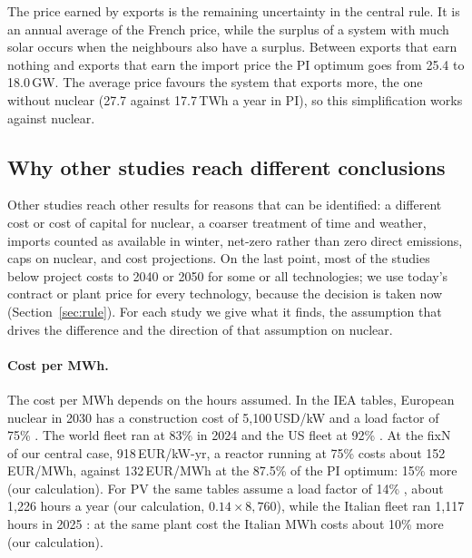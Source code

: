 The price earned by exports is the remaining uncertainty in the central rule. It is an annual average of the French price, while the surplus of a system with much solar occurs when the neighbours also have a surplus. Between exports that earn nothing and exports that earn the import price the PI optimum goes from 25.4 to 18.0\,GW. The average price favours the system that exports more, the one without nuclear (27.7 against 17.7\,TWh a year in PI), so this simplification works against nuclear.


\subsection{Why other studies reach different conclusions}\label{sec:others}
Other studies reach other results for reasons that can be identified: a different cost or cost of capital for nuclear, a coarser treatment of time and weather, imports counted as available in winter, net-zero rather than zero direct emissions, caps on nuclear, and cost projections. On the last point, most of the studies below project costs to 2040 or 2050 for some or all technologies; we use today's contract or plant price for every technology, because the decision is taken now (Section~\ref{sec:rule}). For each study we give what it finds, the assumption that drives the difference and the direction of that assumption on nuclear.

\paragraph{Cost per MWh.} The cost per MWh depends on the hours assumed. In the IEA tables, European nuclear in 2030 has a construction cost of 5{,}100\,USD/kW and a load factor of 75\% \citep[Annex~B, Tables B.4a and B.4b]{IEA2024WEO}. The world fleet ran at 83\% in 2024 \citep{WNAPerformance2025} and the US fleet at 92\% \citep{EIA2025TIE}. At the fixN of our central case, 918\,EUR/kW-yr, a reactor running at 75\% costs about 152\,EUR/MWh, against 132\,EUR/MWh at the 87.5\% of the PI optimum: 15\% more (our calculation). For PV the same tables assume a load factor of 14\% \citep[Table B.4a]{IEA2024WEO}, about 1{,}226 hours a year (our calculation, $0.14 \times 8{,}760$), while the Italian fleet ran 1{,}117 hours in 2025 \citep{GSEPV2025}: at the same plant cost the Italian MWh costs about 10\% more (our calculation).

